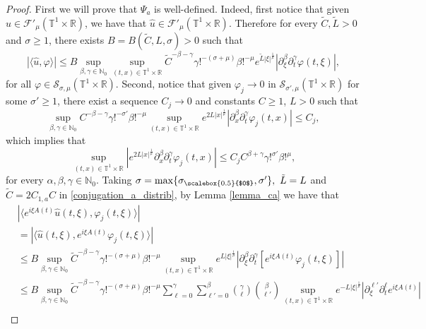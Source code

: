 \documentclass[11pt,reqno]{amsart}
\numberwithin{equation}{section}
\theoremstyle{definition}
\theoremstyle{definition}
\newcommand{\T}{\mathbb{T}}
\newcommand{\R}{\mathbb{R}}
\newcommand{\N}{\mathbb{N}}
\newcommand{\g}{\mathbb{T}^1\times\mathbb{R}}
\newcommand{\SSmu}{\mathscr{F}'_{\mu}(\T^1\times\R)}
\newcommand{\sigmac}{\sigma_{\scalebox{0.5}{$0$}}}
\begin{document}
\begin{proof}
    First we will prove that $\Psi_a$ is well-defined. Indeed, first notice that given $u\in\SSmu$, we have that $\widehat{u}\in\SSmu$. Therefore for every $\tilde{C},\tilde L>0$ and $\sigma\geq 1$, there exists $B=B(\tilde{C},L,\sigma)>0$ such that 
    \begin{equation}\label{conjugation_a_distrib}
        |\langle \widehat{u},\varphi\rangle| \leq B\sup_{\beta,\gamma\in\N_0}\sup_{(t,x)\in\g} \tilde C^{-\beta-\gamma}\gamma!^{-(\sigma+\mu)}\beta!^{-\mu}e^{\tilde L|\xi|^{\frac{1}{\mu}}}|\partial_\xi^\beta\partial_t^\gamma\varphi(t,\xi)|,
    \end{equation} 
    for all $\varphi\in\mathcal{S}_{\sigma,\mu}(\g)$. Second, notice that given $\varphi_j\to0$ in $\mathcal{S}_{\sigma',\mu}(\g)$ for some $\sigma'\geq 1$, there exist a sequence $C_j\to 0$ and constants $C\geq 1$, $L>0$ such that
    \begin{equation*}
       \sup_{\beta,\gamma\in\N_0} C^{-\beta-\gamma}\gamma!^{-\sigma'}\beta!^{-\mu}\sup_{(t,x)\in\T^1\times\R}e^{2L|x|^{\frac{1}{\mu}}}|\partial_x^\beta\partial_t^\gamma \varphi_j(t,x)|\leq C_j,
    \end{equation*}
    which implies that
        \begin{equation*}
       \sup_{(t,x)\in \T^1\times\R}|e^{2L|x|^{\frac{1}{\mu}}}\partial_x^\beta\partial_t^\gamma \varphi_j(t,x)|\leq C_j C^{\beta+\gamma}\gamma!^{\sigma'}\beta!^{\mu},
    \end{equation*}
    for every $\alpha,\beta,\gamma\in\N_0$. Taking $\sigma=\max\{\sigmac,\sigma'\},\ \tilde L=L$ and $\tilde C=2C_{1,a}C$ in \eqref{conjugation_a_distrib},  by Lemma \ref{lemma_ca} we have that
    \begin{align*}
        &|\langle e^{i\xi A(t)}\widehat{u}(t,\xi),\varphi_j(t,\xi)\rangle|\\
        & =|\langle \widehat{u}(t,\xi),e^{i\xi A(t)}\varphi_j(t,\xi)
        \rangle|\\
        & \leq B\sup_{\beta,\gamma\in\N_0} \tilde{C}^{-\beta-\gamma}\gamma!^{-(\sigma+\mu)}\beta!^{-\mu}\sup_{(t,x)\in\T^1\times\R}e^{L|\xi|^{\frac{1}{\mu}}}|\partial_\xi^{\beta}\partial_t^{\gamma}[e^{i\xi A(t)}\varphi_j(t,\xi)]|\\
        &\leq B\sup_{\beta,\gamma\in\N_0} \tilde{C}^{-\beta-\gamma}\gamma!^{-(\sigma+\mu)}\beta!^{-\mu} \sum_{\ell=0}^\gamma\sum_{\ell'=0}^\beta \binom{\gamma}{\ell}\binom{\beta}{\ell'}\sup_{(t,x)\in\T^1\times\R}e^{-L|\xi|^{\frac{1}{\mu}}}|\partial_\xi^{\ell'}\partial_t^{\ell}e^{i\xi A(t)}|\\

\end{align*}
\end{proof}
\end{document}
